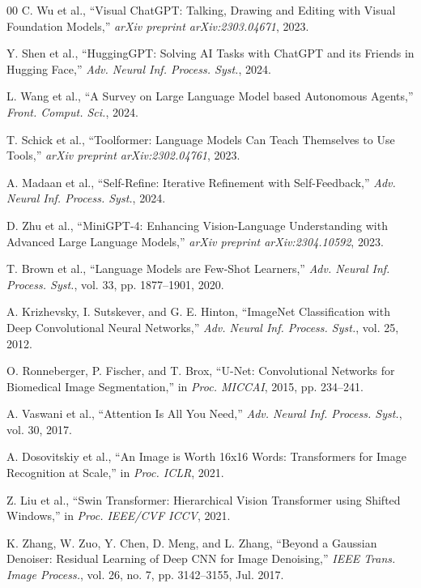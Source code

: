 \documentclass[journal, 10pt]{IEEEtran}
\begin{document}
\begin{thebibliography}{00}
C. Wu et al., ``Visual ChatGPT: Talking, Drawing and Editing with Visual Foundation Models,'' \textit{arXiv preprint arXiv:2303.04671}, 2023.

Y. Shen et al., ``HuggingGPT: Solving AI Tasks with ChatGPT and its Friends in Hugging Face,'' \textit{Adv. Neural Inf. Process. Syst.}, 2024.

L. Wang et al., ``A Survey on Large Language Model based Autonomous Agents,'' \textit{Front. Comput. Sci.}, 2024.

T. Schick et al., ``Toolformer: Language Models Can Teach Themselves to Use Tools,'' \textit{arXiv preprint arXiv:2302.04761}, 2023.

A. Madaan et al., ``Self-Refine: Iterative Refinement with Self-Feedback,'' \textit{Adv. Neural Inf. Process. Syst.}, 2024.

D. Zhu et al., ``MiniGPT-4: Enhancing Vision-Language Understanding with Advanced Large Language Models,'' \textit{arXiv preprint arXiv:2304.10592}, 2023.

T. Brown et al., ``Language Models are Few-Shot Learners,'' \textit{Adv. Neural Inf. Process. Syst.}, vol. 33, pp. 1877--1901, 2020.

A. Krizhevsky, I. Sutskever, and G. E. Hinton, ``ImageNet Classification with Deep Convolutional Neural Networks,'' \textit{Adv. Neural Inf. Process. Syst.}, vol. 25, 2012.

O. Ronneberger, P. Fischer, and T. Brox, ``U-Net: Convolutional Networks for Biomedical Image Segmentation,'' in \textit{Proc. MICCAI}, 2015, pp. 234--241.

A. Vaswani et al., ``Attention Is All You Need,'' \textit{Adv. Neural Inf. Process. Syst.}, vol. 30, 2017.

A. Dosovitskiy et al., ``An Image is Worth 16x16 Words: Transformers for Image Recognition at Scale,'' in \textit{Proc. ICLR}, 2021.

Z. Liu et al., ``Swin Transformer: Hierarchical Vision Transformer using Shifted Windows,'' in \textit{Proc. IEEE/CVF ICCV}, 2021.

K. Zhang, W. Zuo, Y. Chen, D. Meng, and L. Zhang, ``Beyond a Gaussian Denoiser: Residual Learning of Deep CNN for Image Denoising,'' \textit{IEEE Trans. Image Process.}, vol. 26, no. 7, pp. 3142--3155, Jul. 2017.


\end{thebibliography}
\end{document}

